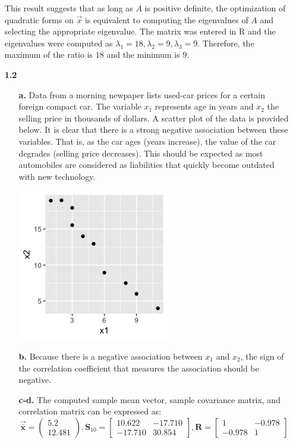 \documentclass[oneside,12pt,letterpaper]{article}
\newcommand\m[1]{\begin{bmatrix}#1\end{bmatrix}}
\newcommand\p[1]{\begin{pmatrix}#1\end{pmatrix}}
\begin{document}
\begin{enumerate}
			This result suggests that as long as $A$ is positive definite, the optimization of quadratic forms on $\vec{x}$ is equivalent to computing the eigenvalues of $A$ and selecting the appropriate eigenvalue. The matrix was entered in R and the eigenvalues were computed as $\lambda_{1}=18,\lambda_{2}=9,\lambda_{3}=9$. Therefore, the maximum of the ratio is $18$ and the minimum is $9$.
		\pagebreak
		\item[\textbf{1.2}]
			\begin{enumerate}
				\item[\textbf{a.}]
					Data from a morning newpaper lists used-car prices for a certain foreign compact car. The variable $x_{1}$ represents age in years and $x_{2}$ the selling price in thousands of dollars. A scatter plot of the data is provided below. It is clear that there is a strong negative association between these variables. That is, as the car ages (years increase), the value of the car degrades (selling price decreases). This should be expected as most automobiles are considered as liabilities that quickly become outdated with new technology.
					\begin{center} \includegraphics{plot1_2_1.png} \end{center}

				\item[\textbf{b.}]
					Because there is a negative association between $x_{1}$ and $x_{2}$, the sign of the correlation coefficient that measures the association should be negative.

				\item[\textbf{c-d.}]
					The computed sample mean vector, sample covariance matrix, and correlation matrix can be expressed as:
					$$\vec{\bar{\textbf{x}}}=\p{5.2\\12.481},
					\textbf{S}_{10}=\m{10.622&-17.710\\-17.710&30.854},
					\textbf{R}=\m{1&-0.978\\-0.978&1}$$


\end{enumerate}
\end{enumerate}
\end{document}

